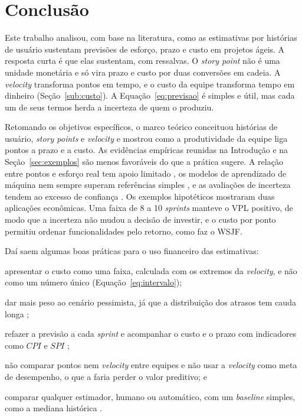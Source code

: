 
\section{Conclusão}
\label{sec:conclusao}

Este trabalho analisou, com base na literatura, como as estimativas por histórias
de usuário sustentam previsões de esforço, prazo e custo em projetos ágeis. A
resposta curta é que elas sustentam, com ressalvas. O \textit{story point} não é
uma unidade monetária e só vira prazo e custo por duas conversões em cadeia. A
\textit{velocity} transforma pontos em tempo, e o custo da equipe transforma
tempo em dinheiro (Seção~\ref{sub:custo}). A Equação~\ref{eq:previsao} é simples
e útil, mas cada um de seus termos herda a incerteza de quem o produziu.

Retomando os objetivos específicos, o marco teórico conceituou histórias de
usuário, \textit{story points} e \textit{velocity} e mostrou como a produtividade
da equipe liga pontos a prazo e a custo. As evidências empíricas reunidas na
Introdução e na Seção~\ref{sec:exemplos} são menos favoráveis do que a prática
sugere. A relação entre pontos e esforço real tem apoio limitado
\cite{tawosi2022}, os modelos de aprendizado de máquina nem sempre superam
referências simples \cite{tawosi2023}, e as avaliações de incerteza tendem ao
excesso de confiança \cite{jorgensen2005}. Os exemplos hipotéticos mostraram
duas aplicações econômicas. Uma faixa de 8 a 10 \textit{sprints} manteve o VPL
positivo, de modo que a incerteza não mudou a decisão de investir, e o custo por
ponto permitiu ordenar funcionalidades pelo retorno, como faz o WSJF.

Daí saem algumas boas práticas para o uso financeiro das estimativas:
%
\begin{alineas}
  \item apresentar o custo como uma faixa, calculada com os extremos da
        \textit{velocity}, e não como um número único (Equação~\ref{eq:intervalo});
  \item dar mais peso ao cenário pessimista, já que a distribuição dos atrasos
        tem cauda longa \cite{little2006};
  \item refazer a previsão a cada \textit{sprint} e acompanhar o custo e o prazo
        com indicadores como $CPI$ e $SPI$ \cite{sulaiman2006};
  \item não comparar pontos nem \textit{velocity} entre equipes e não usar a
        \textit{velocity} como meta de desempenho, o que a faria perder o valor
        preditivo; e
  \item comparar qualquer estimador, humano ou automático, com um
        \textit{baseline} simples, como a mediana histórica \cite{sarro2018}.
\end{alineas}

